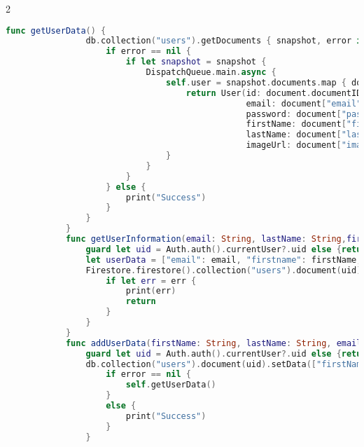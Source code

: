 \begin{spacing}{2}
\end{spacing}
\hspace{-10mm}
\begin{minipage}{\textwidth}
    \linespread{0.8}\selectfont
    \begin{lstlisting}[language=swift]   
            func getUserData() {
                db.collection("users").getDocuments { snapshot, error in
                    if error == nil {
                        if let snapshot = snapshot {
                            DispatchQueue.main.async {
                                self.user = snapshot.documents.map { document in
                                    return User(id: document.documentID,
                                                email: document["email"] as? String ?? "",
                                                password: document["password"] as? String ?? "",
                                                firstName: document["firstName"] as? String ?? "",
                                                lastName: document["lastName"] as? String ?? "",
                                                imageUrl: document["imageUrl"] as? String ?? "")
                                }
                            }
                        }
                    } else {
                        print("Success")
                    }
                }
            }
            func getUserInformation(email: String, lastName: String,firstName: String,password: String, imageUrl: String){
                guard let uid = Auth.auth().currentUser?.uid else {return}
                let userData = ["email": email, "firstname": firstName, "lastname": lastName, "imageurl": imageUrl, "id": uid]
                Firestore.firestore().collection("users").document(uid).setData(userData) { err in
                    if let err = err {
                        print(err)
                        return
                    }
                }
            }
            func addUserData(firstName: String, lastName: String, email: String, password: String) {
                guard let uid = Auth.auth().currentUser?.uid else {return}
                db.collection("users").document(uid).setData(["firstName": firstName, "lastName": lastName, "email": email, "imageUrl": "ImageURL", "password": password]) { error in
                    if error == nil {
                        self.getUserData()
                    }
                    else {
                        print("Success")
                    }
                }

\end{lstlisting}
\end{minipage}

